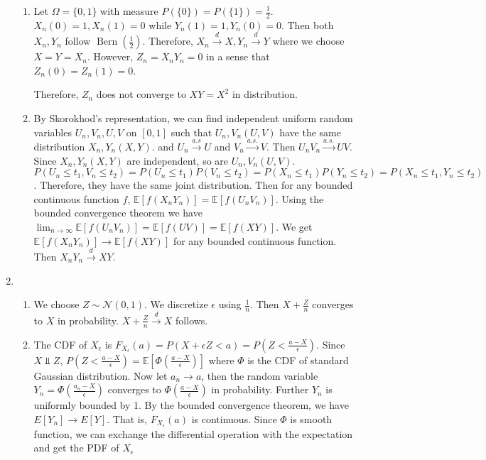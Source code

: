 \documentclass{article}
\DeclareMathOperator{\Bern}{Bern}
\begin{document}
\begin{enumerate}
\begin{enumerate}
    \item Let $\Omega=\{0,1\}$ with measure $P(\{0\})=P(\{1\})=\frac{1}{2}$.
    $X_n(0)=1, X_n(1)=0$ while $Y_n(1)=1, Y_n(0)=0$. Then both $X_n, Y_n$
    follow $\Bern(\frac{1}{2})$. Therefore, $X_n \xrightarrow{d} X,
    Y_n \xrightarrow{d} Y$ where we choose $X=Y=X_n$.
    However, $Z_n = X_n Y_n = 0$ in a sense that $Z_n(0)=Z_n(1)=0$.
    
    Therefore, $Z_n$ does not converge to $XY=X^2$ in distribution.
    \item By Skorokhod's representation, we can find independent uniform random variables $U_n, V_n, U,V$ on $[0,1]$ such that
    $U_n, V_n(U,V)$ have the same distribution $X_n,Y_n(X,Y)$.
    and $U_n \xrightarrow{a.s} U$ and $V_n \xrightarrow{a.s.} V$. Then $U_n V_n \xrightarrow{a.s.} UV$.
    Since $X_n, Y_n(X,Y)$ are independent, so are $U_n, V_n(U,V)$.
    $P(U_n \leq t_1, V_n \leq t_2) = P(U_n \leq t_1) P(V_n \leq t_2) = P(X_n \leq t_1) P(Y_n \leq t_2) = P(X_n \leq t_1, Y_n \leq t_2)$.
    Therefore, they have the same joint distribution.
    Then for any bounded continuous function $f$,
    $\mathbb{E}[f(X_n Y_n)]
    = \mathbb{E}[f(U_n V_n)]$. Using the bounded
    convergence theorem we have
    $\lim_{n\to \infty} \mathbb{E}[f(U_n V_n)] = 
    \mathbb{E}[f(UV)] = \mathbb{E}[f(XY)]$.
    We get $\mathbb{E}[f(X_n Y_n)] \to \mathbb{E}[f(XY)]$
    for any bounded continuous function.
    Then $X_n Y_n \xrightarrow{d} XY$.
\end{enumerate}
\item
\begin{enumerate}
    \item We choose $Z \sim \mathcal{N}(0,1)$. We discretize
    $\epsilon$ using $\frac{1}{n}$. Then $X + \frac{Z}{n}$
    converges to $X$ in probability. $X + \frac{Z}{n} \xrightarrow{d} X$ follows.
    \item The CDF of $X_{\epsilon}$ is $F_{X_\epsilon}(a)
    =P(X+\epsilon Z<a)=P(Z<\frac{a-X}{\epsilon})$. Since
    $X \Perp Z$, $P(Z<\frac{a-X}{\epsilon})=\mathbb{E}[\Phi(\frac{a-X}{\epsilon})]$ where $\Phi$ is the CDF of standard Gaussian
    distribution. Now let $a_n \to a$, then the random
    variable $Y_n = \Phi(\frac{a_n-X}{\epsilon})$ converges
    to $\Phi(\frac{a-X}{\epsilon})$ in probability.
    Further $Y_n$ is uniformly bounded by 1.
    By the bounded convergence theorem, we have
    $E[Y_n] \to E[Y]$. That is, $F_{X_\epsilon}(a)$
    is continuous. Since $\Phi$ is smooth function,
    we can exchange the differential operation with
    the expectation and get the PDF of $X_{\epsilon}$

\end{enumerate}
\end{enumerate}
\end{document}

